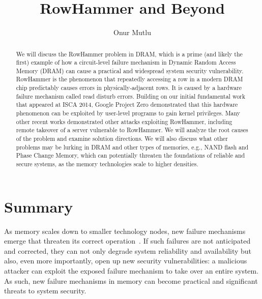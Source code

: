 \documentclass[runningheads]{llncs}
\begin{document}
%
\title{RowHammer and Beyond}
%
%
\author{Onur Mutlu}
%

%
%
\maketitle              %
%

\begin{abstract}
We will discuss the RowHammer problem in DRAM, which is a prime (and
likely the first) example of how a circuit-level failure mechanism in
Dynamic Random Access Memory (DRAM) can cause a practical and
widespread system security vulnerability.  RowHammer is the phenomenon
that repeatedly accessing a row in a modern DRAM chip predictably
causes errors in physically-adjacent rows. It is caused by a hardware
failure mechanism called read disturb errors.  Building on our initial
fundamental work that appeared at ISCA 2014, Google Project Zero
demonstrated that this hardware phenomenon can be exploited by
user-level programs to gain kernel privileges. Many other recent works
demonstrated other attacks exploiting RowHammer, including remote
takeover of a server vulnerable to RowHammer. We will analyze the root
causes of the problem and examine solution directions. We will also
discuss what other problems may be lurking in DRAM and other types of
memories, e.g., NAND flash and Phase Change Memory, which can
potentially threaten the foundations of reliable and secure systems,
as the memory technologies scale to higher densities.
\end{abstract}


\section{Summary}
  
As memory scales down to smaller technology nodes, new failure
mechanisms emerge that threaten its correct
operation~\cite{mutlu-imw13,onur-date17}. If such failures are not
anticipated and corrected, they can not only degrade system
reliability and availability but also, even more importantly, open up
new security vulnerabilities: a malicious attacker can exploit the
exposed failure mechanism to take over an entire system. As such, new
failure mechanisms in memory can become practical and significant
threats to system security.
\end{document}
